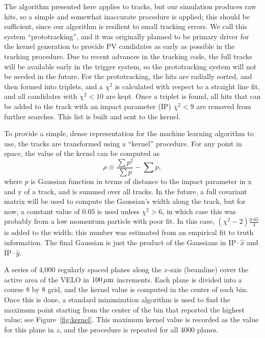 \documentclass[a4paper]{jpconf}
\begin{document}
The algorithm presented here applies to tracks, but our simulation produces raw hits, so a simple and somewhat inaccurate procedure is applied; this should be sufficient, since our algorithm is resilient to small tracking errors. We call this system ``prototracking'', and it was originally planned to be primary driver for the kernel generation to provide PV candidates as early as possible in the tracking procedure. Due to recent advances in the tracking code, the full tracks will be available early in the trigger system, so the prototracking system will not be needed in the future. For the prototracking, the hits are radially sorted, and then formed into triplets, and a $\chi^2$ is calculated with respect to a straight line fit, and all candidates with $\chi^2 < 10$ are kept. Once a triplet is found, all hits that can be added to the track with an impact parameter (IP) $\chi^2<9$ are removed from further searches. This list is built and sent to the kernel.

To provide a simple, dense representation for the machine learning algorithm to use, the tracks are transformed using a ``kernel'' procedure. For any point in space, the value of the kernel can be computed as 
%
\begin{equation}
\rho \equiv  \frac{ \sum  p^2}{\sum  p} - \sum p,
\end{equation}
%
where $p$ is Gaussian function in terms of distance to the impact parameter in x and y of a track, and is summed over all tracks.
In the future, a full covariant matrix will be used to compute the Gaussian's width along the track, but for now, a constant value of 0.05 is used unless $\chi^2>6$, in which case this was probably from a low momentum particle with poor fit. In this case, $ (\chi^2-2)\frac{0.05}{4} $ is added to the width; this number was estimated from an empirical fit to truth information.
The final Gaussian is just the product of the Gaussians in $ \mathrm{IP} \cdot \hat{x}$ and $ \mathrm{IP} \cdot \hat{y}$.

A series of 4,000 regularly spaced planes along the $z$-axis (beamline) cover the active area of the VELO in $\unit[100]{\mu m}$ increments. Each plane is divided into a course 8 by 8 grid, and the kernel value is computed in the center of each bin. Once this is done, a standard minimization algorithm is used to find the maximum point starting from the center of the bin that reported the highest value; see Figure~\ref{fig:kernel}. This maximum kernel value is recorded as the value for this plane in $z$, and the procedure is repeated for all 4000 planes.
\end{document}
